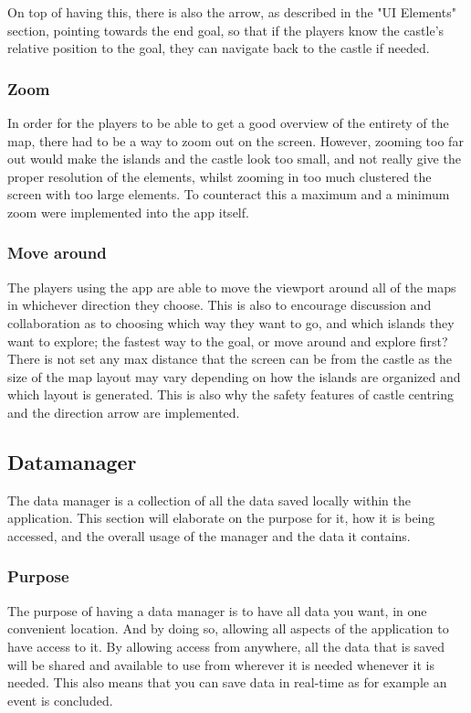 On top of having this, there is also the arrow, as described in the "UI Elements" section, pointing towards the end goal, so that if the players know the castle's relative position to the goal, they can navigate back to the castle if needed. 

\subsubsection{Zoom}
In order for the players to be able to get a good overview of the entirety of the map, there had to be a way to zoom out on the screen. 
However, zooming too far out would make the islands and the castle look too small, and not really give the proper resolution of the elements, whilst zooming in too much clustered the screen with too large elements. To counteract this a maximum and a minimum zoom were implemented into the app itself.	

	
\subsubsection{Move around}

The players using the app are able to move the viewport around all of the maps in whichever direction they choose. This is also to encourage discussion and collaboration as to choosing which way they want to go, and which islands they want to explore; the fastest way to the goal, or move around and explore first?
There is not set any max distance that the screen can be from the castle as the size of the map layout may vary depending on how the islands are organized and which layout is generated. This is also why the safety features of castle centring and the direction arrow are implemented.

\subsection{Datamanager}
\label{sec:datman}
The data manager is a collection of all the data saved locally within the application. This section will elaborate on the purpose for it, how it is being accessed, and the overall usage of the manager and the data it contains.

\subsubsection{Purpose}
	
The purpose of having a data manager is to have all data you want, in one convenient location. And by doing so, allowing all aspects of the application to have access to it. By allowing access from anywhere, all the data that is saved will be shared and available to use from wherever it is needed whenever it is needed. This also means that you can save data in real-time as for example an event is concluded.


